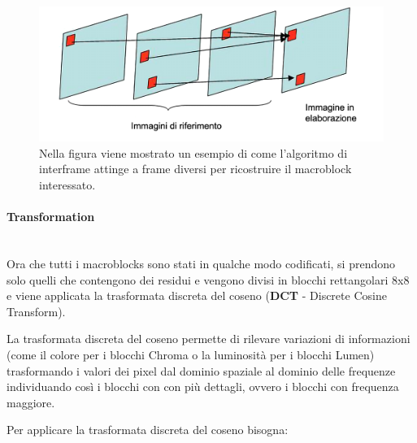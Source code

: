 \documentclass[a4paper,12pt, oneside]{article}
\begin{document}
\begin{figure}[h]
    \centering
    \includegraphics[width=1\textwidth]{images/interframe.png}
    \caption{Nella figura viene mostrato un esempio di come l'algoritmo di interframe
    attinge a frame diversi per ricostruire il macroblock interessato.}
    \label{fig:interframe}
\end{figure}

\paragraph{Transformation}\hphantom{A}\\
Ora che tutti i macroblocks sono stati in qualche modo codificati, si prendono solo quelli che contengono
dei residui e vengono divisi in blocchi rettangolari 8x8 e viene applicata la trasformata discreta del
coseno (\textbf{DCT} - Discrete Cosine Transform).

La trasformata discreta del coseno permette di rilevare variazioni di informazioni (come il colore per
i blocchi Chroma o la luminosità per i blocchi Lumen) trasformando i valori dei pixel dal dominio
spaziale al dominio delle frequenze individuando così i blocchi con con più dettagli, ovvero i blocchi
con frequenza maggiore.

Per applicare la trasformata discreta del coseno bisogna:
\end{document}
